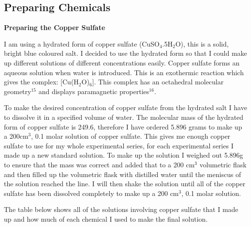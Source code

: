 	\subsection{Preparing Chemicals} \label{Preparing Chemicals}

\textbf{Preparing the Copper Sulfate}

I am using a hydrated form of copper sulfate (CuSO$_4$.5H$_2$O), this is a solid, bright blue coloured salt. I decided to use the hydrated form so that I could make up different solutions of different concentrations easily. Copper sulfate forms an aqueous solution when water is introduced. This is an exothermic reaction which gives the complex: [Cu(H$_2$O)$_6$]. This complex has an octahedral molecular geometry$^{15}$ and displays paramagnetic properties$^{16}$.

To make the desired concentration of copper sulfate from the hydrated salt I have to dissolve it in a specified volume of water. The molecular mass of the hydrated form of copper sulfate is 249.6, therefore I have ordered 5.896 grams to make up a 200cm$^3$, 0.1 molar solution of copper sulfate. This gives me enough copper sulfate to use for my whole experimental series, for each experimental series I made up a new standard solution. To make up the solution I weighed out 5.896g to ensure that the mass was correct and added that to a 200 cm$^3$ volumetric flask and then filled up the volumetric flask with distilled water until the meniscus of the solution reached the line. I will then shake the solution until all of the copper sulfate has been dissolved completely to make up a 200 cm$^3$, 0.1 molar solution.



The table below shows all of the solutions involving copper sulfate that I made up and how much of each chemical I used to make the final solution.




